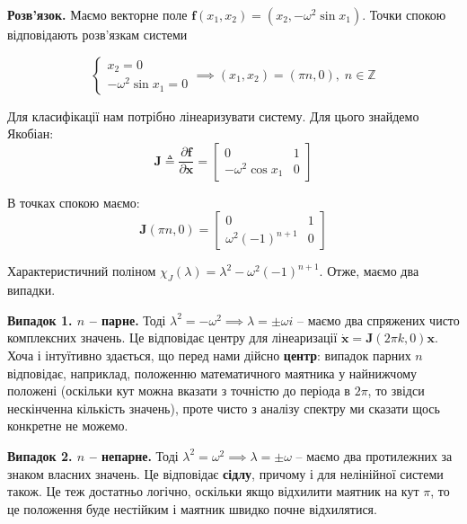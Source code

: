 \documentclass[oneside,solution]{tmpl}
\begin{document}
\textbf{Розв'язок.} Маємо векторне поле $\boldsymbol{f}(x_1,x_2) = (x_2,-\omega^2 \sin x_1)$. Точки спокою відповідають розв'язкам системи

\begin{equation}
    \begin{cases}
        x_2 = 0 \\
        -\omega^2 \sin x_1 = 0
    \end{cases} \implies (x_1, x_2) = (\pi n, 0), \; n \in \mathbb{Z}
\end{equation}

Для класифікації нам потрібно лінеаризувати систему. Для цього знайдемо Якобіан:
\begin{equation}
    \boldsymbol{J} \triangleq \frac{\partial\boldsymbol{f}}{\partial\mathbf{x}} = \begin{bmatrix}
        0 & 1 \\
        -\omega^2 \cos x_1 & 0
    \end{bmatrix}
\end{equation}

В точках спокою маємо:
\begin{equation}
    \boldsymbol{J}(\pi n, 0) = \begin{bmatrix}
        0 & 1 \\ \omega^2 (-1)^{n+1} & 0
    \end{bmatrix}
\end{equation}

Характеристичний поліном $\chi_J(\lambda) = \lambda^2 - \omega^2(-1)^{n+1}$. Отже, маємо два випадки.

\textbf{Випадок 1. $n$ -- парне.} Тоді $\lambda^2 = -\omega^2 \implies \lambda = \pm \omega i$ -- маємо два спряжених чисто комплексних значень. Це відповідає центру для лінеаризації $\dot{\mathbf{x}} = \boldsymbol{J}(2\pi k, 0)\mathbf{x}$. Хоча і інтуїтивно здається, що перед нами дійсно \textbf{центр}: випадок парних $n$ відповідає, наприклад, положенню математичного маятника у найнижчому положені (оскільки кут можна вказати з точністю до періода в $2\pi$, то звідси нескінченна кількість значень), проте чисто з аналізу спектру ми сказати щось конкретне не можемо. 

\textbf{Випадок 2. $n$ -- непарне.} Тоді $\lambda^2 = \omega^2 \implies \lambda = \pm \omega$ -- маємо два протилежних за знаком власних значень. Це відповідає \textbf{сідлу}, причому і для нелінійної системи також. Це теж достатньо логічно, оскільки якщо відхилити маятник на кут $\pi$, то це положення буде нестійким і маятник швидко почне відхилятися. 
\end{document}
